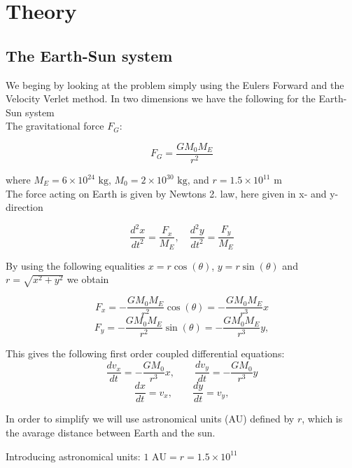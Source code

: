 \documentclass[../main.tex]{subfiles}
\begin{document}
\section{Theory}\label{theory}
\subsection{The Earth-Sun system}
We beging by looking at the problem simply using the Eulers Forward and the Velocity Verlet method.
In two dimensions we have the following for the Earth-Sun system \\

The gravitational force $F_G$:

\begin{equation}
  F_G= \frac{GM_0M_E}{r^2}
\end{equation}

where $M_E = 6\times 10^{24}\text{ kg}$,  $ M_0 = 2\times 10^{30}\text{ kg}$, and  $r = 1.5\times 10^{11}\text{ m}$\\
The force acting on Earth is given by Newtons 2. law, here given in x- and y- direction

$$ \frac{d^2x}{dt^2} = \frac{F_x}{M_E}, \quad \frac{d^2y}{dt^2} = \frac{F_y}{M_E}$$

By using the following equalities $x = r \cos(\theta)$,  $y = r\sin(\theta)$ and $r = \sqrt{x^2 +y^2}$ we obtain

\begin{equation}
  F_x = - \frac{GM_0M_E}{r^2} \cos(\theta) =- \frac{GM_0M_E}{r^3}x
\end{equation}
\begin{equation}
  F_y = - \frac{GM_0M_E}{r^2}\sin(\theta) =- \frac{GM_0M_E}{r^3}y,
\end{equation}

This gives the following first order  coupled differential equations:
\begin{equation}
  \frac{dv_x}{dt} = - \frac{GM_0}{r^3}x,\qquad \frac{dv_y}{dt} = - \frac{GM_0}{r^3}y
\end{equation}
\begin{equation}
  \frac{dx}{dt} = v_x,\qquad \frac{dy}{dt} = v_y,
\end{equation}

In order to simplify we will use astronomical units (AU) defined by $r$, which is the avarage distance between Earth and the sun.

Introducing astronomical units: $1\text{ AU}= r = 1.5 \times 10^{11}$
\end{document}
